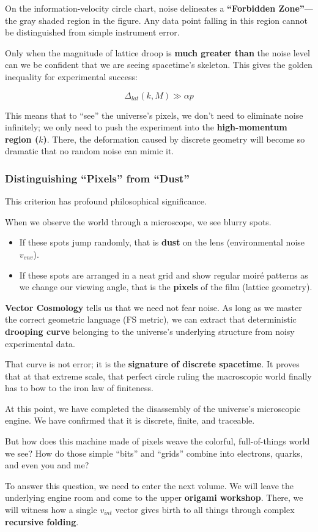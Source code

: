 On the information-velocity circle chart, noise delineates a \textbf{``Forbidden Zone''}---the gray shaded region in the figure. Any data point falling in this region cannot be distinguished from simple instrument error.

Only when the magnitude of lattice droop is \textbf{much greater than} the noise level can we be confident that we are seeing spacetime's skeleton. This gives the golden inequality for experimental success:

\[\Delta_{lat}(k, M) \gg \alpha p\]

This means that to ``see'' the universe's pixels, we don't need to eliminate noise infinitely; we only need to push the experiment into the \textbf{high-momentum region ($k$)}. There, the deformation caused by discrete geometry will become so dramatic that no random noise can mimic it.

\subsubsection{Distinguishing ``Pixels'' from ``Dust''}

This criterion has profound philosophical significance.

When we observe the world through a microscope, we see blurry spots.

\begin{itemize}
\item If these spots jump randomly, that is \textbf{dust} on the lens (environmental noise $v_{env}$).

\item If these spots are arranged in a neat grid and show regular moiré patterns as we change our viewing angle, that is the \textbf{pixels} of the film (lattice geometry).
\end{itemize}

\textbf{Vector Cosmology} tells us that we need not fear noise. As long as we master the correct geometric language (FS metric), we can extract that deterministic \textbf{drooping curve} belonging to the universe's underlying structure from noisy experimental data.

That curve is not error; it is the \textbf{signature of discrete spacetime}. It proves that at that extreme scale, that perfect circle ruling the macroscopic world finally has to bow to the iron law of finiteness.

At this point, we have completed the disassembly of the universe's microscopic engine. We have confirmed that it is discrete, finite, and traceable.

But how does this machine made of pixels weave the colorful, full-of-things world we see? How do those simple ``bits'' and ``grids'' combine into electrons, quarks, and even you and me?

To answer this question, we need to enter the next volume. We will leave the underlying engine room and come to the upper \textbf{origami workshop}. There, we will witness how a single $v_{int}$ vector gives birth to all things through complex \textbf{recursive folding}.

